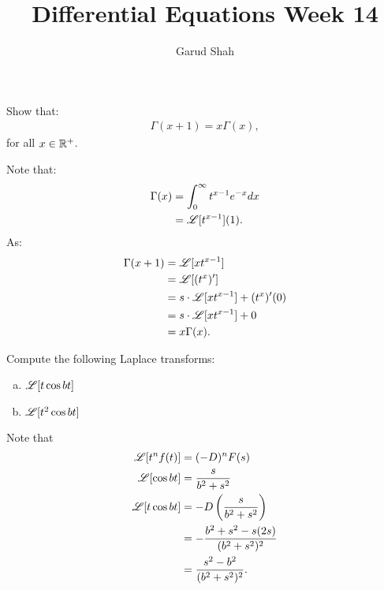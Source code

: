 \documentclass[11pt]{article}
\title{Differential Equations Week \textbf{14}}
\author{Garud Shah}
\begin{document}
    \maketitle \newpage 
    \begin{problem}
        Show that:
        \begin{align}
            \Gamma(x+1) = x\Gamma(x),
        \end{align}
        for all $x \in \mathbb R^+$.
    \end{problem}
    \begin{solution}
        Note that:
        \begin{align}
            \Gamma (x) &= \int _{0}^{\infty }t^{x-1}e^{-x}dx \\
            &= \mathscr L[t^{x-1}](1).
        \end{align}
        As:
        \begin{align}
            \Gamma(x+1) &= \mathscr L[xt^{x-1}] \\ 
            &= \mathscr L[(t^{x})'] \\
            &= s \cdot \mathscr L[xt^{x-1}] + (t^x)'(0) \\
            &= s \cdot \mathscr L[xt^{x-1}] + 0 \\
            &= x\Gamma(x).
        \end{align}
    \end{solution}
    \newpage
    \begin{problem}
        Compute the following Laplace transforms:
        \begin{enumerate}[(a)]
            \item $\mathscr L [t \cos bt]$
            \item $\mathscr L [t^2 \cos bt]$
        \end{enumerate}
    \end{problem}
    \begin{solution}[Solution 2a] Note that 
        \begin{align}
            \mathscr L [t^n f(t)] &= (-D)^nF(s) \\
            \mathscr L [\cos bt] &= \dfrac{s}{b^2+s^2} \\
            \mathscr L [t \cos bt] &= -D \left(\dfrac{s}{b^2+s^2}\right) \\
            &= -\dfrac{b^2+s^2-s(2s)}{(b^2 + s^2)^2} \\
            &= \dfrac{s^2-b^2}{(b^2+s^2)^2}.
        \end{align}
    \end{solution}
\end{document}
